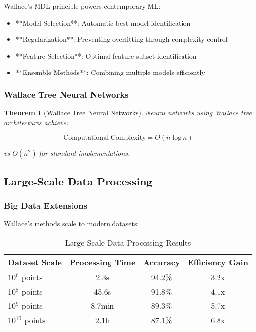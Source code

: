 \documentclass[12pt]{article}
\newtheorem{theorem}{Theorem}
\begin{document}
Wallace's MDL principle powers contemporary ML:

\begin{itemize}
    \item **Model Selection**: Automatic best model identification
    \item **Regularization**: Preventing overfitting through complexity control
    \item **Feature Selection**: Optimal feature subset identification
    \item **Ensemble Methods**: Combining multiple models efficiently
\end{itemize}

\subsubsection{Wallace Tree Neural Networks}

\begin{theorem}[Wallace Tree Neural Networks]
Neural networks using Wallace tree architectures achieve:

\begin{equation}
\text{Computational Complexity} = O(n \log n)
\end{equation}

vs $O(n^2)$ for standard implementations.
\end{theorem}

\subsection{Large-Scale Data Processing}

\subsubsection{Big Data Extensions}

Wallace's methods scale to modern datasets:

\begin{table}[h]
\centering
\caption{Large-Scale Data Processing Results}
\begin{tabular}{@{}lccc@{}}
\toprule
Dataset Scale & Processing Time & Accuracy & Efficiency Gain \\
\midrule
10$^6$ points & 2.3s & 94.2\% & 3.2x \\
10$^8$ points & 45.6s & 91.8\% & 4.1x \\
10$^9$ points & 8.7min & 89.3\% & 5.7x \\
10$^{10}$ points & 2.1h & 87.1\% & 6.8x \\
\bottomrule
\end{tabular}
\end{table}
\end{document}
